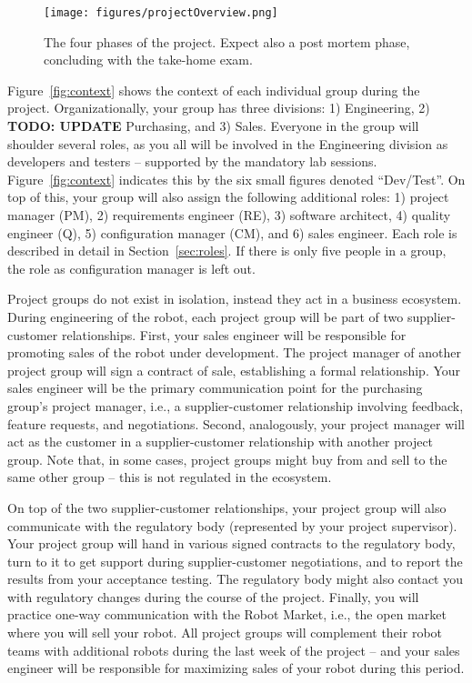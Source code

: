 \documentclass{scrreprt}
\begin{document}
\begin{figure}
\centering
\texttt{[image: figures/projectOverview.png]}
\caption{The four phases of the project. Expect also a post mortem phase, concluding with the take-home exam.}
\label{fig:overview}
\end{figure}

Figure~\ref{fig:context} shows the context of each individual group during the project. Organizationally, your group has three divisions: 1) Engineering, 2) \textbf{TODO: UPDATE} Purchasing, and 3) Sales. Everyone in the group will shoulder several roles, as you all will be involved in the Engineering division as developers and testers -- supported by the mandatory lab sessions. Figure~\ref{fig:context} indicates this by the six small figures denoted ``Dev/Test''. On top of this, your group will also assign the following additional roles: 1) project manager (PM), 2) requirements engineer (RE), 3) software architect, 4) quality engineer (Q), 5) configuration manager (CM), and 6) sales engineer. Each role is described in detail in Section~\ref{sec:roles}. If there is only five people in a group, the role as configuration manager is left out.

Project groups do not exist in isolation, instead they act in a business ecosystem. During engineering of the robot, each project group will be part of two supplier-customer relationships. First, your sales engineer will be responsible for promoting sales of the robot under development. The project manager of another project group will sign a contract of sale, establishing a formal relationship. Your sales engineer will be the primary communication point for the purchasing group's project manager, i.e., a supplier-customer relationship involving feedback, feature requests, and negotiations. Second, analogously, your project manager will act as the customer in a supplier-customer relationship with another project group. Note that, in some cases, project groups might buy from and sell to the same other group -- this is not regulated in the ecosystem.

On top of the two supplier-customer relationships, your project group will also communicate with the regulatory body (represented by your project supervisor). Your project group will hand in various signed contracts to the regulatory body, turn to it to get support during supplier-customer negotiations, and to report the results from your acceptance testing. The regulatory body might also contact you with regulatory changes during the course of the project. Finally, you will practice one-way communication with the Robot Market, i.e., the open market where you will sell your robot. All project groups will complement their robot teams with additional robots during the last week of the project -- and your sales engineer will be responsible for maximizing sales of your robot during this period. 
\end{document}
